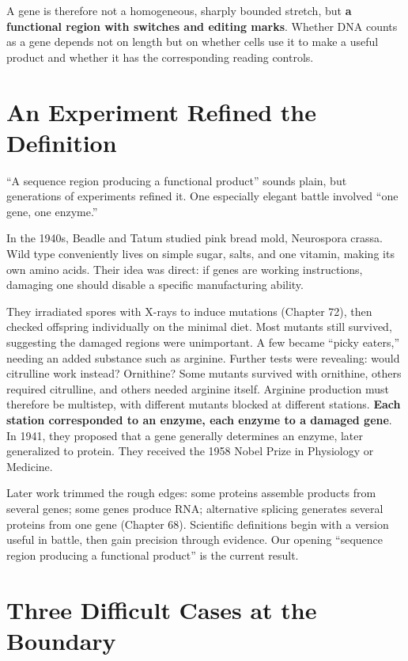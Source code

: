 A gene is therefore not a homogeneous, sharply bounded stretch, but \textbf{a functional region with switches and editing marks}. Whether DNA counts as a gene depends not on length but on whether cells use it to make a useful product and whether it has the corresponding reading controls.

\section{An Experiment Refined the Definition}

``A sequence region producing a functional product'' sounds plain, but generations of experiments refined it. One especially elegant battle involved ``one gene, one enzyme.''

\begin{zhengju}
In the 1940s, Beadle and Tatum studied pink bread mold, Neurospora crassa. Wild type conveniently lives on simple sugar, salts, and one vitamin, making its own amino acids. Their idea was direct: if genes are working instructions, damaging one should disable a specific manufacturing ability.

They irradiated spores with X-rays to induce mutations (Chapter 72), then checked offspring individually on the minimal diet. Most mutants still survived, suggesting the damaged regions were unimportant. A few became ``picky eaters,'' needing an added substance such as arginine. Further tests were revealing: would citrulline work instead? Ornithine? Some mutants survived with ornithine, others required citrulline, and others needed arginine itself. Arginine production must therefore be multistep, with different mutants blocked at different stations. \textbf{Each station corresponded to an enzyme, each enzyme to a damaged gene}. In 1941, they proposed that a gene generally determines an enzyme, later generalized to protein. They received the 1958 Nobel Prize in Physiology or Medicine.

Later work trimmed the rough edges: some proteins assemble products from several genes; some genes produce RNA; alternative splicing generates several proteins from one gene (Chapter 68). Scientific definitions begin with a version useful in battle, then gain precision through evidence. Our opening ``sequence region producing a functional product'' is the current result.
\end{zhengju}

\section{Three Difficult Cases at the Boundary}

